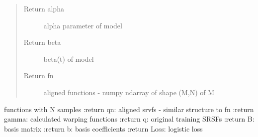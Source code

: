 \documentclass[letterpaper,10pt,english]{sphinxmanual}
\begin{document}
\begin{fulllineitems}
\begin{quote}
\begin{description}
\item[{Return alpha}] \leavevmode
alpha parameter of model

\item[{Return beta}] \leavevmode
beta(t) of model

\item[{Return fn}] \leavevmode
aligned functions - numpy ndarray of shape (M,N) of M

\end{description}\end{quote}

functions with N samples
:return qn: aligned srvfs - similar structure to fn
:return gamma: calculated warping functions
:return q: original training SRSFs
:return B: basis matrix
:return b: basis coefficients
:return Loss: logistic loss

\end{fulllineitems}

\end{document}
